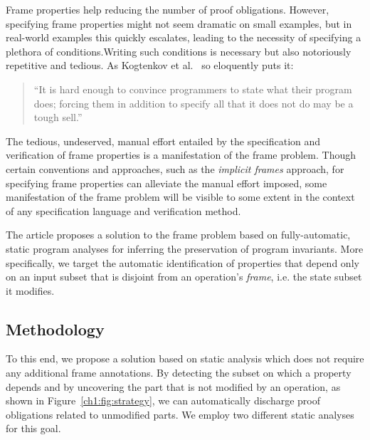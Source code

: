 \documentclass[11pt]{article}
\begin{document}
Frame properties help reducing the number of proof
obligations. However, specifying frame properties might not seem dramatic
on small examples, but in real-world examples this quickly
escalates, leading to the necessity of specifying a plethora of
conditions.Writing such conditions is necessary but also notoriously
repetitive and tedious.  As Kogtenkov et al.~\cite{kogtenkov15}
so eloquently puts it:

\begin{quotation}
``It is hard enough to convince  programmers to state what their program does; forcing 
them in addition to specify all that it does not do may be a tough sell.'' 
\end{quotation}

The tedious, undeserved, manual effort entailed by the specification and
verification of frame properties is a manifestation of the frame problem. Though
certain conventions and approaches, such as the \emph{implicit frames} approach,
for specifying frame properties can alleviate the manual effort imposed, some
manifestation of the frame problem will be visible to some extent in the context
of any specification language and verification method.

The article proposes a solution to the frame problem based on
fully-automatic, static program analyses for inferring the
preservation of program invariants. More specifically, we target the
automatic identification of properties that depend only on an input
subset that is disjoint from an operation's \emph{frame}, i.e. the
state subset it modifies.

\subsection{Methodology}
\label{sec:methodology}

To this end, we propose a solution based on static analysis which does not
require any additional frame annotations. By detecting the subset
on which a property depends and by uncovering the part that is not modified by
an operation, as shown in Figure~\ref{ch1:fig:strategy}, we can automatically
discharge proof obligations related to unmodified parts. We employ two different
static analyses for this goal.
\end{document}
